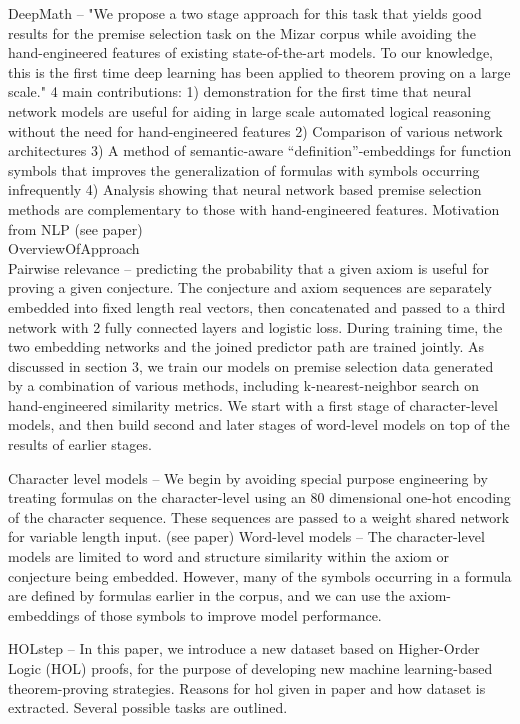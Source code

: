 \documentclass{article}
\begin{document}
DeepMath \cite{DeepMath} --  "We propose a two stage approach for this task
that yields good results for the premise selection task on the Mizar corpus
while avoiding the hand-engineered features of existing state-of-the-art
models. To our knowledge, this is the first time deep learning has been applied
to theorem proving on a large scale." 4 main contributions: 1) demonstration
for the first time that neural network models are useful for aiding in large
scale automated logical reasoning without the need for hand-engineered features
2) Comparison of various network architectures 3) A method of semantic-aware
“definition”-embeddings for function symbols that improves the generalization
of formulas with symbols occurring infrequently 4) Analysis showing that neural
network based premise selection methods are complementary to those with
hand-engineered features. Motivation from NLP (see paper)\\
OverviewOfApproach\\
Pairwise relevance -- predicting the probability that a given axiom is useful
for proving a given conjecture. The conjecture and axiom sequences are
separately embedded into fixed length real vectors, then concatenated and
passed to a third network with 2 fully connected layers and logistic loss.
During training time, the two embedding networks and the joined predictor path
are trained jointly. As discussed in section 3, we train our models on premise
selection data generated by a combination of various methods, including
k-nearest-neighbor search on hand-engineered similarity metrics. We start with
a first stage of character-level models, and then build second and later stages
of word-level models on top of the results of earlier stages.

Character level models -- We begin by avoiding special purpose engineering by
treating formulas on the character-level using an 80 dimensional one-hot
encoding of the character sequence. These sequences are passed to a weight
shared network for variable length input. (see paper)
Word-level models -- The character-level models are limited to word and
structure similarity within the axiom or conjecture being embedded.  However,
many of the symbols occurring in a formula are defined by formulas earlier in
the corpus, and we can use the axiom-embeddings of those symbols to improve
model performance.

HOLstep \cite{Holstep} -- In this paper, we introduce a new dataset based on
Higher-Order Logic (HOL) proofs, for the purpose of developing new machine
learning-based theorem-proving strategies. Reasons for hol given in paper and
how dataset is extracted. Several possible tasks are outlined.
\end{document}
